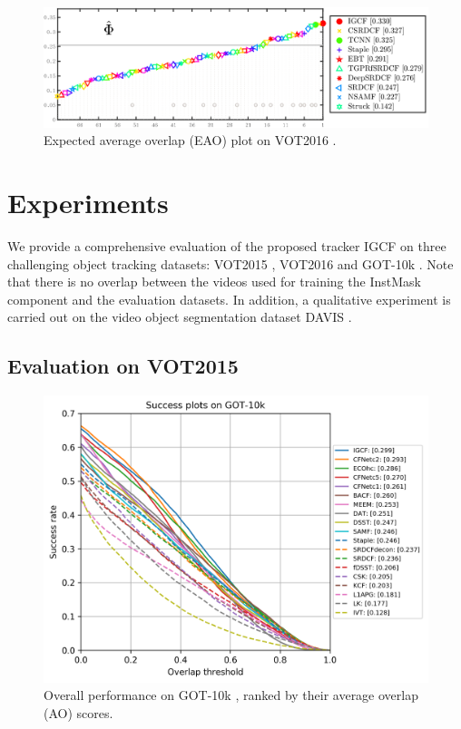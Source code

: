 \documentclass[review]{elsarticle}
\begin{document}
\begin{CJK*}{UTF8}{gbsn}
\begin{figure}
    \centering
    \includegraphics[width=12cm]{images/vot/eao_rank_vot2016.png}
    \caption{Expected average overlap (EAO) plot on VOT2016 \cite{Kristan2016TheVO}.}
    \label{fig:vot16}
\end{figure}

\section{Experiments}
We provide a comprehensive evaluation of the proposed tracker IGCF on three challenging object tracking datasets: VOT2015 \cite{Kristan2015TheVO}, VOT2016 \cite{Kristan2016TheVO} and GOT-10k \cite{Huang2018GOT10kAL}. Note that there is no overlap between the videos used for training the InstMask component and the evaluation datasets. In addition, a qualitative experiment is carried out on the video object segmentation dataset DAVIS \cite{Perazzi2016}.
\subsection{Evaluation on VOT2015}

\begin{figure}
    \centering
    \includegraphics[width=12cm]{images/got10k/success_plot.png}
    \caption{Overall performance on GOT-10k \cite{Huang2018GOT10kAL}, ranked by their average overlap (AO) scores.}
    \label{fig:got10k}
\end{figure}


\end{CJK*}
\end{document}
